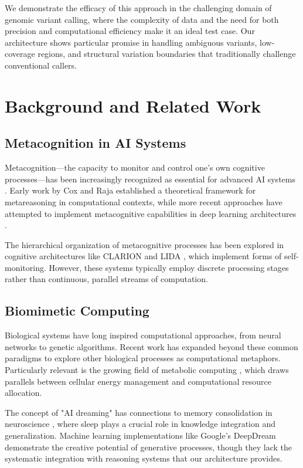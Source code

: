 \documentclass[11pt,a4paper,twocolumn]{article}
\begin{document}
We demonstrate the efficacy of this approach in the challenging domain of genomic variant calling, where the complexity of data and the need for both precision and computational efficiency make it an ideal test case. Our architecture shows particular promise in handling ambiguous variants, low-coverage regions, and structural variation boundaries that traditionally challenge conventional callers.

\section{Background and Related Work}

\subsection{Metacognition in AI Systems}
Metacognition—the capacity to monitor and control one's own cognitive processes—has been increasingly recognized as essential for advanced AI systems \cite{cox2011metareasoning, anderson2017metacognition}. Early work by Cox and Raja \cite{cox2011metareasoning} established a theoretical framework for metareasoning in computational contexts, while more recent approaches have attempted to implement metacognitive capabilities in deep learning architectures \cite{wang2019metacognition}.

The hierarchical organization of metacognitive processes has been explored in cognitive architectures like CLARION \cite{sun2016hierarchy} and LIDA \cite{franklin2007lida}, which implement forms of self-monitoring. However, these systems typically employ discrete processing stages rather than continuous, parallel streams of computation.

\subsection{Biomimetic Computing}
Biological systems have long inspired computational approaches, from neural networks to genetic algorithms. Recent work has expanded beyond these common paradigms to explore other biological processes as computational metaphors. Particularly relevant is the growing field of metabolic computing \cite{adamatzky2017advances}, which draws parallels between cellular energy management and computational resource allocation.

The concept of "AI dreaming" has connections to memory consolidation in neuroscience \cite{walker2017sleep}, where sleep plays a crucial role in knowledge integration and generalization. Machine learning implementations like Google's DeepDream \cite{mordvintsev2015deepdream} demonstrate the creative potential of generative processes, though they lack the systematic integration with reasoning systems that our architecture provides.
\end{document}
